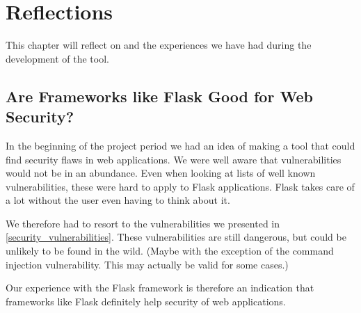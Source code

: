 \section{Reflections}
This chapter will reflect on \pyt{} and the experiences we have had during the development of the tool.

\subsection{Are Frameworks like Flask Good for Web Security?}
In the beginning of the project period we had an idea of making a tool that could find security flaws in web applications.
We were well aware that vulnerabilities would not be in an abundance.
Even when looking at lists of well known vulnerabilities, these were hard to apply to Flask applications.
Flask takes care of a lot without the user even having to think about it.

We therefore had to resort to the vulnerabilities we presented in \cref{security_vulnerabilities}.
These vulnerabilities are still dangerous, but could be unlikely to be found in the wild. (Maybe with the exception of the command injection vulnerability. This may actually be valid for some cases.)

Our experience with the Flask framework is therefore an indication that frameworks like Flask definitely help security of web applications.
